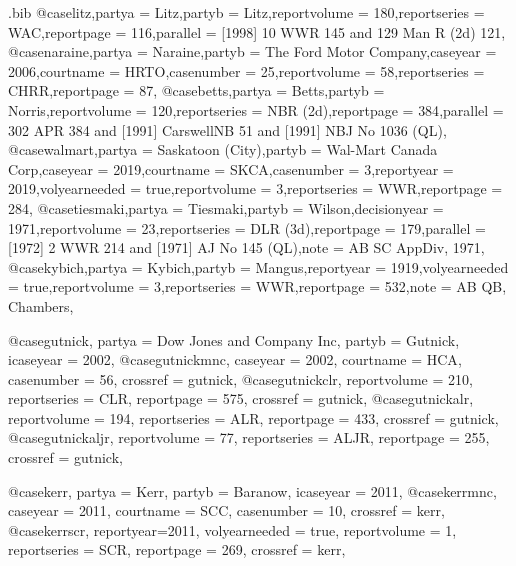 \begin{filecontents*}[overwrite]{\jobname.bib}
@case{litz,partya = {Litz},partyb = {Litz},reportvolume = {180},reportseries = {WAC},reportpage = {116},parallel = {[1998] 10 WWR 145 and 129 Man R (2d) 121},}
@case{naraine,partya = {Naraine},partyb = {The Ford Motor Company},caseyear = {2006},courtname = {HRTO},casenumber = {25},reportvolume = {58},reportseries = {CHRR},reportpage = {87},}
@case{betts,partya = {Betts},partyb = {Norris},reportvolume = {120},reportseries = {NBR (2d)},reportpage = {384},parallel = {302 APR 384 and [1991] CarswellNB 51 and [1991] NBJ No 1036 (QL)},}
@case{walmart,partya = {Saskatoon (City)},partyb = {Wal-Mart Canada Corp},caseyear = {2019},courtname = {SKCA},casenumber = {3},reportyear = {2019},volyearneeded = {true},reportvolume = {3},reportseries = {WWR},reportpage = {284},}
@case{tiesmaki,partya = {Tiesmaki},partyb = {Wilson},decisionyear = {1971},reportvolume = {23},reportseries = {DLR (3d)},reportpage = {179},parallel = {[1972] 2 WWR 214 and [1971] AJ No 145 (QL)},note = {AB SC AppDiv, 1971},}
@case{kybich,partya = {Kybich},partyb = {Mangus},reportyear = {1919},volyearneeded = {true},reportvolume = {3},reportseries = {WWR},reportpage = {532},note = {AB QB, Chambers},}








@case{gutnick,
  partya = {Dow Jones and Company Inc}, 
  partyb = {Gutnick},
  icaseyear = {2002},
  }
@case{gutnickmnc,
  caseyear = {2002},
  courtname = {HCA},
  casenumber = {56},
  crossref = {gutnick},
  }
@case{gutnickclr,
  reportvolume = {210},
  reportseries = {CLR},
  reportpage = {575},
  crossref = {gutnick},
  	}
@case{gutnickalr,
  reportvolume = {194},
  reportseries = {ALR},
  reportpage = {433},
  crossref = {gutnick},
  	}
@case{gutnickaljr,
  reportvolume = {77},
  reportseries = {ALJR},
  reportpage = {255},
  crossref = {gutnick},
  	}





@case{kerr,
  partya = {Kerr}, 
  partyb = {Baranow},
  icaseyear = {2011},
  }
@case{kerrmnc,
  caseyear = {2011},
  courtname = {SCC},
  casenumber = {10},
  crossref = {kerr},
  }
@case{kerrscr,
  reportyear={2011},
  volyearneeded = {true},
  reportvolume = {1},
  reportseries = {SCR},
  reportpage = {269},
  crossref = {kerr},
  	}




\end{filecontents*}
